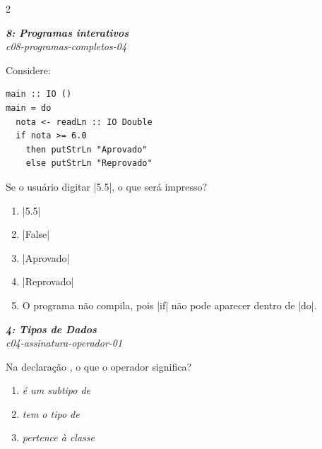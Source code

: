 \documentclass[a4paper,10pt,brazil]{article}
\begin{document}
\begin{multicols}{2}
\begin{enumerate}
\end{enumerate}

\begin{flushright}
  \footnotesize
  \textit{\textbf{8: Programas interativos}}\\
  \textit{c08-programas-completos-04}\\

\end{flushright}
Considere:

\begin{verbatim}
main :: IO ()
main = do
  nota <- readLn :: IO Double
  if nota >= 6.0
    then putStrLn "Aprovado"
    else putStrLn "Reprovado"
\end{verbatim}

Se o usuário digitar \haskellinline|5.5|, o que será impresso?

\begin{enumerate}
  \item \haskellinline|5.5|

  \item \haskellinline|False|

  \item \haskellinline|Aprovado|

  \item \haskellinline|Reprovado|

  \item O programa não compila, pois \haskellinline|if| não pode aparecer dentro de \haskellinline|do|.


\end{enumerate}

\begin{flushright}
  \footnotesize
  \textit{\textbf{4: Tipos de Dados}}\\
  \textit{c04-assinatura-operador-01}\\

\end{flushright}
Na declaração , o que o operador \haskellinline{::} significa?

\begin{enumerate}
  \item \emph{é um subtipo de}

  \item \emph{tem o tipo de}

  \item \emph{pertence à classe}


\end{enumerate}
\end{multicols}
\end{document}
